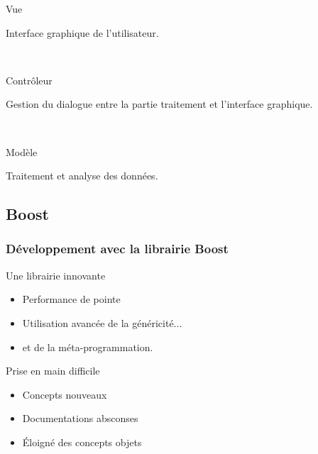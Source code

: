 {\begin{minipage}{0.45\textwidth}
\begin{flushleft}
\begin{center}
\end{center}
\end{flushleft}
\end{minipage}
\begin{minipage}{0.45\textwidth}
\begin{flushright}
\begin{block}{Vue}
\begin{center}
Interface graphique de l'utilisateur.
\end{center}
\end{block}
~\\
\begin{block}{Contrôleur}
\begin{center}
Gestion du dialogue entre la partie traitement et l'interface graphique.
\end{center}
\end{block}
~\\
\begin{block}{Modèle}
\begin{center}
Traitement et analyse des données.
\end{center}
\end{block}
\end{flushright}
\end{minipage}
}

\subsection{Boost}
\frame
{
\frametitle{D\'eveloppement avec la librairie Boost}
\begin{block}{Une librairie innovante}
 \begin{itemize}
\item Performance de pointe
  \item Utilisation avancée de la généricité...
  \item et de la méta-programmation.
 \end{itemize}
\end{block}
\vfill
\begin{block}{Prise en main difficile}
 \begin{itemize}
  \item Concepts nouveaux
  \item Documentations absconses
  \item \'Eloigné des concepts objets
 \end{itemize}
\end{block}
}